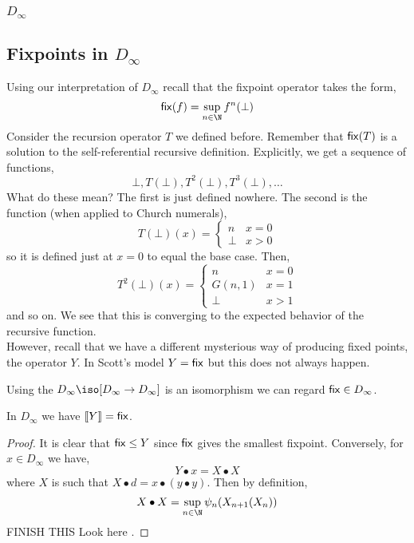 \documentclass[12pt]{article}
\newcommand{\br}[1]{\llbracket #1 \rrbracket}
\begin{document}
\subsubsection{$D_\infty$}




\subsection{Fixpoints in $D_{\infty}$}

Using our interpretation of $D_{\infty}$ recall that the fixpoint operator takes the form,
\[ \fix(f) = \sup_{n \in \N} f^n(\bot) \]
Consider the recursion operator $T$ we defined before. Remember that $\mathsf{fix}(T)$ is a solution to the self-referential recursive definition. Explicitly, we get a sequence of functions,
\[ \bot, T(\bot), T^2(\bot), T^3(\bot), \dots \]
What do these mean? The first is just defined nowhere. The second is the function (when applied to Church numerals),
\[ T(\bot)(x) = \begin{cases}
n & x = 0
\\
\bot & x > 0
\end{cases} \]
so it is defined just at $x = 0$ to equal the base case. Then,
\[  T^2(\bot)(x) = 
\begin{cases}
n & x = 0
\\
G(n, 1) & x = 1
\\
\bot & x > 1
\end{cases}
\]
and so on. We see that this is converging to the expected behavior of the recursive function. 
\bigskip\\
However, recall that we have a different mysterious way of producing fixed points, the operator $Y$. In Scott's model $Y = \mathsf{fix}$ but this does not always happen.

\begin{rmk}
Using the $D_{\infty} \iso [D_{\infty} \to D_{\infty}]$ is an isomorphism we can regard $\mathsf{fix} \in D_{\infty}$. 
\end{rmk}

\begin{prop}
In $D_{\infty}$ we have $\br{Y} = \fix$.
\end{prop}

\begin{proof}
It is clear that $\mathsf{fix} \le Y$ since $\mathsf{fix}$ gives the smallest fixpoint. Conversely, for $x \in D_{\infty}$ we have,
\[ Y \bullet x = X \bullet X \]
where $X$ is such that $X \bullet d = x \bullet (y \bullet y)$. Then by definition,
\[ X \bullet X = \sup_{n \in \N} \psi_n(X_{n+1}(X_n)) \]
{\color{red} FINISH THIS}
Look here .
\end{proof}
\end{document}
